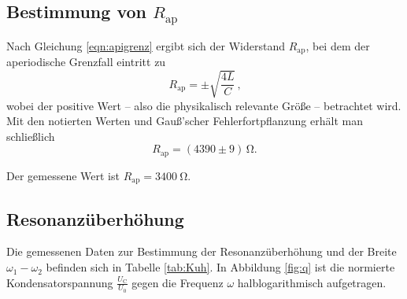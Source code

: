 \subsection{Bestimmung von $R_{\text{ap}}$}

Nach Gleichung \eqref{eqn:apigrenz} ergibt sich der Widerstand $R_{\text{ap}}$, bei dem der
aperiodische Grenzfall eintritt zu
\begin{equation}
	R_{\text{ap}} = \pm \sqrt{\frac{4L}{C}} \, \text{,}
	\label{eqn:rap}
\end{equation}
wobei der positive Wert -- also die physikalisch relevante Größe -- betrachtet wird.
Mit den notierten Werten und Gauß'scher Fehlerfortpflanzung erhält man schließlich
\begin{equation*}
	R_{\text{ap}} = (4390 \pm 9) \, \si{\ohm} \text{.}
\end{equation*}

Der gemessene Wert ist $R_{\text{ap}} = \SI{3400}{\ohm}$.
\subsection{Resonanzüberhöhung}
Die gemessenen Daten zur Bestimmung der Resonanzüberhöhung und der Breite $ \omega_1 - \omega_2 $ befinden sich in Tabelle \ref{tab:Kuh}.
In Abbildung \ref{fig:q} ist die normierte Kondensatorspannung $\frac{U_{\mathrm{C}}}{U_{\mathrm{0}}}$ gegen die Frequenz $\omega$ halblogarithmisch aufgetragen.


